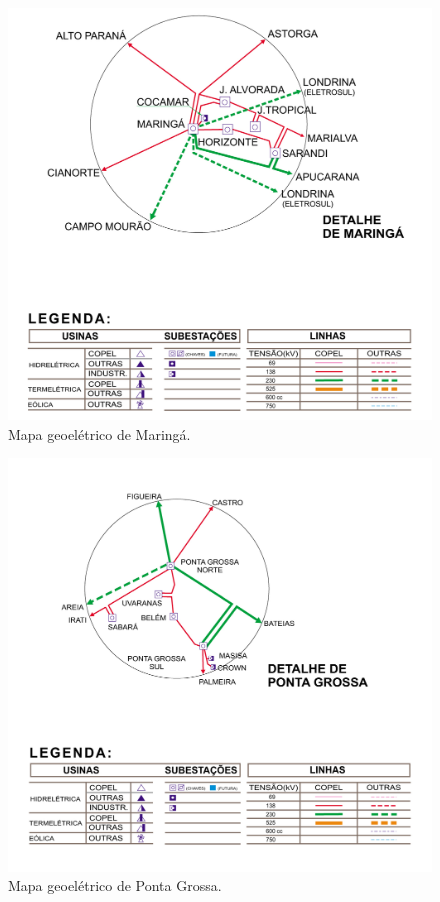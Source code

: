 \documentclass[grad,numbers]{coppe}
\begin{document}
  \begin{figure}[H]
  \includegraphics[width=1\linewidth]{img/mapa_geoeletrico_maringa} \caption{Mapa geoelétrico de Maringá.}\label{fig:unnamed-chunk-7}
  \end{figure}
  \begin{figure}[H]
  \includegraphics[width=1\linewidth]{img/mapa_geoeletrico_ponta_grossa} \caption{Mapa geoelétrico de Ponta Grossa.}\label{fig:unnamed-chunk-8}
  \end{figure}
\end{document}
